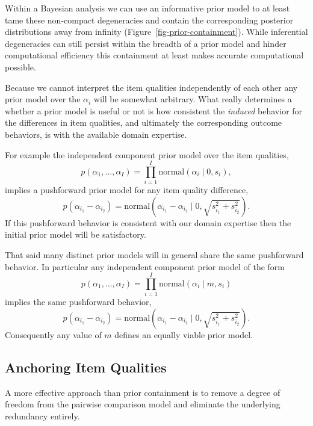 \documentclass[
  letterpaper,
  DIV=11,
  numbers=noendperiod]{scrartcl}
\begin{document}
Within a Bayesian analysis we can use an informative prior model to at
least tame these non-compact degeneracies and contain the corresponding
posterior distributions away from infinity
(Figure~\ref{fig-prior-containment}). While inferential degeneracies can
still persist within the breadth of a prior model and hinder
computational efficiency this containment at least makes accurate
computational possible.

Because we cannot interpret the item qualities independently of each
other any prior model over the \(\alpha_{i}\) will be somewhat
arbitrary. What really determines a whether a prior model is useful or
not is how consistent the \emph{induced} behavior for the differences in
item qualities, and ultimately the corresponding outcome behaviors, is
with the available domain expertise.

For example the independent component prior model over the item
qualities, \[
p( \alpha_{1}, \ldots, \alpha_{I} )
=
\prod_{i = 1}^{I} \text{normal}( \alpha_{i} \mid 0, s_{i} ),
\] implies a pushforward prior model for any item quality difference, \[
p( \alpha_{i_{1}} - \alpha_{i_{2}} )
=
\text{normal} \left( \alpha_{i_{1}} - \alpha_{i_{2}} \mid
                     0, \sqrt{ s_{i_{1}}^{2} + s_{i_{2}}^{2} } \right).
\] If this pushforward behavior is consistent with our domain expertise
then the initial prior model will be satisfactory.

That said many distinct prior models will in general share the same
pushforward behavior. In particular any independent component prior
model of the form \[
p( \alpha_{1}, \ldots, \alpha_{I} )
=
\prod_{i = 1}^{I} \text{normal}( \alpha_{i} \mid m, s_{i} )
\] implies the same pushforward behavior, \[
p( \alpha_{i_{1}} - \alpha_{i_{2}} )
=
\text{normal} \left( \alpha_{i_{1}} - \alpha_{i_{2}} \mid
                     0, \sqrt{ s_{i_{1}}^{2} + s_{i_{2}}^{2} } \right).
\] Consequently any value of \(m\) defines an equally viable prior
model.

\subsection{Anchoring Item Qualities}\label{anchoring-item-qualities}

A more effective approach than prior containment is to remove a degree
of freedom from the pairwise comparison model and eliminate the
underlying redundancy entirely.
\end{document}
